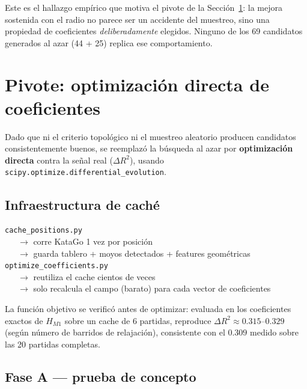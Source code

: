 \documentclass[11pt, a4paper]{article}
\begin{document}
\begin{tcolorbox}[quotebox]
  Este es el hallazgo emp\'irico que motiva el pivote de la
  Secci\'on~\ref{sec:optimizacion}: la mejora sostenida con el radio no
  parece ser un accidente del muestreo, sino una propiedad de
  coeficientes \emph{deliberadamente} elegidos. Ninguno de los 69
  candidatos generados al azar (44 + 25) replica ese comportamiento.
\end{tcolorbox}

\section{Pivote: optimizaci\'on directa de coeficientes}
\label{sec:optimizacion}

Dado que ni el criterio topol\'ogico ni el muestreo aleatorio producen
candidatos consistentemente buenos, se reemplaz\'o la b\'usqueda al
azar por \textbf{optimizaci\'on directa} contra la se\~nal real
($\Delta R^2$), usando \texttt{scipy.optimize.differential\_evolution}.

\subsection{Infraestructura de cach\'e}

\begin{tcolorbox}[codebox]
\texttt{cache\_positions.py} \\
\ \ \ $\to$ corre KataGo 1 vez por posici\'on \\
\ \ \ $\to$ guarda tablero + moyos detectados + features geom\'etricas \\[4pt]
\texttt{optimize\_coefficients.py} \\
\ \ \ $\to$ reutiliza el cache cientos de veces \\
\ \ \ $\to$ solo recalcula el campo (barato) para cada vector de coeficientes
\end{tcolorbox}

La funci\'on objetivo se verific\'o antes de optimizar: evaluada en los
coeficientes exactos de $H_{M1}$ sobre un cache de 6 partidas, reproduce
$\Delta R^2 \approx 0.315$--$0.329$ (seg\'un n\'umero de barridos de
relajaci\'on), consistente con el $0.309$ medido sobre las 20 partidas
completas.

\subsection{Fase A --- prueba de concepto}
\end{document}
